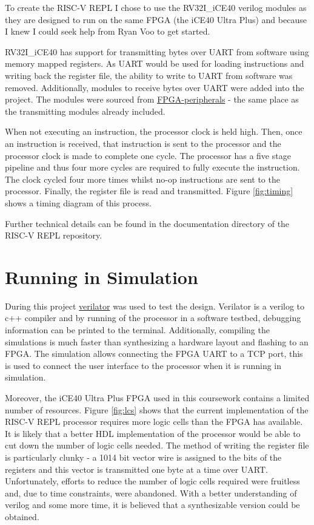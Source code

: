 \documentclass[10pt]{article}
\begin{document}
\begin{multicols}{2}
To create the RISC-V REPL I chose to use the RV32I\_iCE40 verilog modules as they are designed to run on the same FPGA (the iCE40 Ultra Plus) and because I knew I could seek help from Ryan Voo to get started.

RV32I\_iCE40 has support for transmitting bytes over UART from software using memory mapped registers.
As UART would be used for loading instructions and writing back the register file, the ability to write to UART from software was removed.
Additionally, modules to receive bytes over UART were added into the project.
The modules were sourced from \href{https://github.com/FPGAwars/FPGA-peripherals}{FPGA-peripherals} - the same place as the transmitting modules already included\cite{FPGA-peripherals}.

When not executing an instruction, the processor clock is held high.
Then, once an instruction is received, that instruction is sent to the processor and the processor clock is made to complete one cycle.
The processor has a five stage pipeline and thus four more cycles are required to fully execute the instruction.
The clock cycled four more times whilst no-op instructions are sent to the processor.
Finally, the register file is read and transmitted.
Figure \ref{fig:timing} shows a timing diagram of this process.

Further technical details can be found in the documentation directory of the RISC-V REPL repository.

\section{Running in Simulation}

During this project \href{https://www.veripool.org/wiki/verilator}{verilator} was used to test the design.
Verilator is a verilog to c++ compiler and by running of the processor in a software testbed, debugging information can be printed to the terminal.
Additionally, compiling the simulations is much faster than synthesizing a hardware layout and flashing to an FPGA.
The simulation allows connecting the FPGA UART to a TCP port, this is used to connect the user interface to the processor when it is running in simulation.

Moreover, the iCE40 Ultra Plus FPGA used in this coursework contains a limited number of resources.
Figure \ref{fig:lcs} shows that the current implementation of the RISC-V REPL processor requires more logic cells than the FPGA has available.
It is likely that a better HDL implementation of the processor would be able to cut down the number of logic cells needed.
The method of writing the register file is particularly clunky - a 1014 bit vector wire is assigned to the bits of the registers and this vector is transmitted one byte at a time over UART.
Unfortunately, efforts to reduce the number of logic cells required were fruitless and, due to time constraints, were abandoned.
With a better understanding of verilog and some more time, it is believed that a synthesizable version could be obtained.


\end{multicols}
\end{document}
